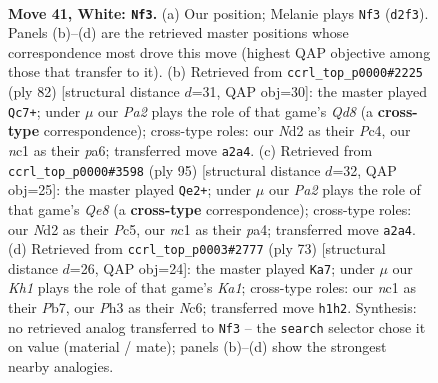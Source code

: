 \documentclass[11pt]{article}
\begin{document}
\clearpage

\begin{figure}[p]\centering
\begin{subfigure}{0.46\textwidth}\centering
\resizebox{\linewidth}{!}{%
\newchessgame
\chessboard[
  setfen={6k1/1p3p2/6p1/p7/7p/7P/P2N1qP1/b1n4K w - - 0 41},
  showmover=false,
  pgfstyle=straightmove, color=movearrow, markmove={d2-f3}
]}
\caption{}
\end{subfigure}\hfill
\begin{subfigure}{0.46\textwidth}\centering
\resizebox{\linewidth}{!}{%
\newchessgame
\chessboard[
  setfen={3Q4/1p3k1p/p5p1/8/P1P5/1q5P/6PK/8 w - - 6 42},
  showmover=false,
  pgfstyle=straightmove, color=movearrow, markmove={d8-c7}
]}
\caption{}
\end{subfigure}
\\[4pt]
\begin{subfigure}{0.46\textwidth}\centering
\resizebox{\linewidth}{!}{%
\newchessgame
\chessboard[
  setfen={8/k7/p2Q4/2p3p1/P5P1/3P1P2/6KP/4q3 b - - 6 48},
  showmover=false,
  pgfstyle=straightmove, color=movearrow, markmove={e1-e2}
]}
\caption{}
\end{subfigure}\hfill
\begin{subfigure}{0.46\textwidth}\centering
\resizebox{\linewidth}{!}{%
\newchessgame
\chessboard[
  setfen={k7/1p4Q1/2n4p/2p5/6p1/P7/KP4P1/3r4 b - - 0 37},
  showmover=false,
  pgfstyle=straightmove, color=movearrow, markmove={a8-a7}
]}
\caption{}
\end{subfigure}
\caption{\textbf{Move 41, White: \texttt{Nf3}.} (a) Our position; Melanie plays \texttt{Nf3} (\texttt{d2f3}). Panels (b)--(d) are the retrieved master positions whose correspondence most drove this move (highest QAP objective among those that transfer to it). (b) Retrieved from \texttt{ccrl\_top\_p0000\#2225} (ply 82) [structural distance $d$=31, QAP obj=30]: the master played \texttt{Qc7+}; under $\mu$ our \emph{Pa2} plays the role of that game's \emph{Qd8} (a \textbf{cross-type} correspondence); cross-type roles: our \emph{N}d2 as their \emph{P}c4, our \emph{n}c1 as their \emph{p}a6; transferred move \texttt{a2a4}. (c) Retrieved from \texttt{ccrl\_top\_p0000\#3598} (ply 95) [structural distance $d$=32, QAP obj=25]: the master played \texttt{Qe2+}; under $\mu$ our \emph{Pa2} plays the role of that game's \emph{Qe8} (a \textbf{cross-type} correspondence); cross-type roles: our \emph{N}d2 as their \emph{P}c5, our \emph{n}c1 as their \emph{p}a4; transferred move \texttt{a2a4}. (d) Retrieved from \texttt{ccrl\_top\_p0003\#2777} (ply 73) [structural distance $d$=26, QAP obj=24]: the master played \texttt{Ka7}; under $\mu$ our \emph{Kh1} plays the role of that game's \emph{Ka1}; cross-type roles: our \emph{n}c1 as their \emph{P}b7, our \emph{P}h3 as their \emph{N}c6; transferred move \texttt{h1h2}. Synthesis: no retrieved analog transferred to \texttt{Nf3} -- the \texttt{search} selector chose it on value (material / mate); panels (b)--(d) show the strongest nearby analogies.}
\label{fig:thought-m80}
\end{figure}
\end{document}
